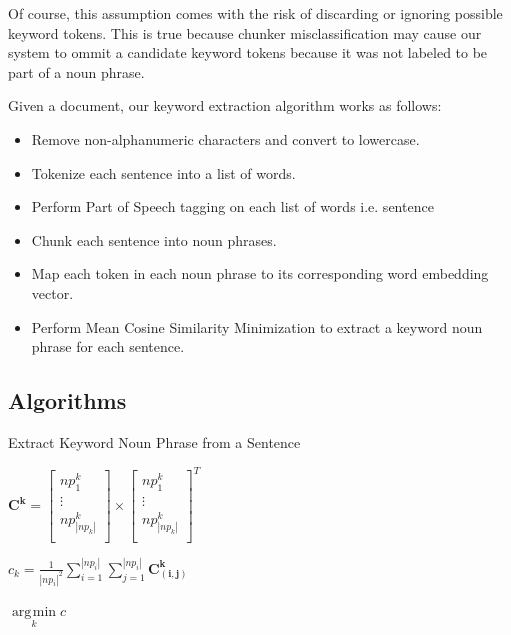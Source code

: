 \documentclass[12pt]{article}
\DeclareMathOperator*{\argmin}{\arg\!\min}
\begin{document}
Of course, this assumption comes with the risk of discarding or ignoring possible keyword tokens. This is true because chunker misclassification
may cause our system to ommit a candidate keyword tokens because it was not labeled to be part of a noun phrase.

Given a document, our keyword extraction algorithm works as follows:
\begin{itemize}
\item Remove non-alphanumeric characters and convert to lowercase.
\item Tokenize each sentence into a list of words.
\item Perform Part of Speech tagging on each list of words i.e. sentence
\item Chunk each sentence into noun phrases.
\item Map each token in each noun phrase to its corresponding word embedding vector.
\item Perform Mean Cosine Similarity Minimization to extract a keyword noun phrase for each sentence.
\end{itemize}


\subsection{Algorithms}
\begin{algorithm}[H]
\caption{Extract Keyword Noun Phrase from a Sentence}
\begin{algorithmic}[1]
\State$ \bm{C^k} = \begin{bmatrix}
         np^{k}_{1} \\
         \vdots \\
         np^{k}_{|np_k|} \\
        \end{bmatrix} \times  \begin{bmatrix}
         np^{k}_{1} \\
         \vdots \\
         np^{k}_{|np_k|} \\
        \end{bmatrix}^{T}$

\State$c_{k} = \frac{1}{|np_i|^2} \sum^{|np_i|}_{i=1} \sum^{|np_i|}_{j=1} \bm{C^{k}_{(i,j)}}$
\EndFor

\Return $\argmin\limits_{k} c$
\EndProcedure
\end{algorithmic}
\end{algorithm}
\end{document}
